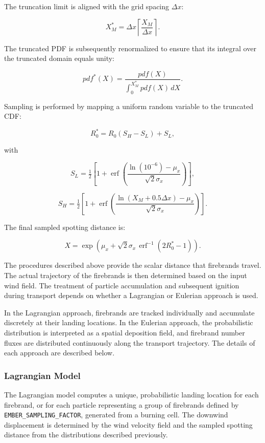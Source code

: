 The truncation limit is aligned with the grid spacing $\Delta x$:

\[
X_M^* = \Delta x \left\lceil \frac{X_M}{\Delta x} \right\rceil.
\]

The truncated PDF is subsequently renormalized to ensure that its integral over the truncated domain equals unity:

\[
pdf^*(X) = \frac{pdf(X)}{\int_0^{X_M^*} pdf(X)\, dX}.
\]

Sampling is performed by mapping a uniform random variable to the truncated CDF:

\[
R_0^* = R_0 (S_H - S_L) + S_L,
\]

with

\[
S_L = \tfrac{1}{2}\left[1 + \operatorname{erf}\!\left(\frac{\ln(10^{-6}) - \mu_x}{\sqrt{2}\sigma_x}\right)\right],
\]

\[
S_H = \tfrac{1}{2}\left[1 + \operatorname{erf}\!\left(\frac{\ln(X_M + 0.5\Delta x) - \mu_x}{\sqrt{2}\sigma_x}\right)\right].
\]

The final sampled spotting distance is:

\[
X = \exp\left(\mu_x + \sqrt{2}\sigma_x \, \operatorname{erf}^{-1}(2R_0^* - 1)\right).
\]

The procedures described above provide the scalar distance that firebrands travel. The actual trajectory of the firebrands is then determined based on the input wind field. The treatment of particle accumulation and subsequent ignition during transport depends on whether a Lagrangian or Eulerian approach is used.

In the Lagrangian approach, firebrands are tracked individually and accumulate discretely at their landing locations. In the Eulerian approach, the probabilistic distribution is interpreted as a spatial deposition field, and firebrand number fluxes are distributed continuously along the transport trajectory. The details of each approach are described below.

\subsubsection{Lagrangian Model}

The Lagrangian model computes a unique, probabilistic landing location for each firebrand, or for each particle representing a group of firebrands defined by \texttt{EMBER\_SAMPLING\_FACTOR}, generated from a burning cell. The downwind displacement is determined by the wind velocity field and the sampled spotting distance from the distributions described previously.


